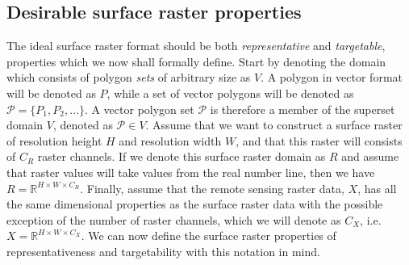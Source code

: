 \subsection{Desirable surface raster properties}
The ideal surface raster format should be both \emph{representative} and \emph{targetable}, properties which we now shall formally define.
Start by denoting the domain which consists of polygon \textit{sets} of arbitrary size as $V$.
A polygon in vector format will be denoted as $P$, while a set of vector polygons will be denoted as $\mathcal{P} = \{P_1, P_2, \dots\}$.
A vector polygon set $\mathcal{P}$ is therefore a member of the superset domain $V$, denoted as $\mathcal{P} \in V$.
Assume that we want to construct a surface raster of resolution height $H$ and resolution width $W$, and that this raster will consists of $C_R$ raster channels.
If we denote this surface raster domain as $R$ and assume that raster values will take values from the real number line, then we have $R = \mathbb{R}^{H \times W \times C_R}$.
Finally, assume that the remote sensing raster data, $X$, has all the same dimensional properties as the surface raster data with the possible exception of the number of raster channels, which we will denote as $C_X$, i.e. $X = \mathbb{R}^{H \times W \times C_X}$.
We can now define the surface raster properties of representativeness and targetability with this notation in mind.
